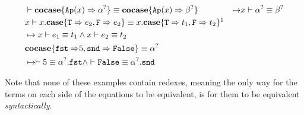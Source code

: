 \documentclass[twoside,12pt,a4paper]{article}
\begin{document}

\begin{example}
    \begin{align*}
    &\vdash \excopatmatch{\Ap{x}\Rightarrow \alphaunifvar} \equiv \excopatmatch{\Ap{x}\Rightarrow\betaunifvar} 
    &\mapsto&x\vdash \alphaunifvar \equiv \betaunifvar
    \\
    &x\vdash x.\expatmatch{\texttt{T} \Rightarrow e_2, \texttt{F} \Rightarrow e_2} \equiv x.\expatmatch{\texttt{T} \Rightarrow t_1, \texttt{F} \Rightarrow t_2}\footnotemark{}
    \\ &\mapsto x\vdash  e_1 \equiv t_1\wedge x\vdash e_2\equiv t_2
    \\
    &\excopatmatch{\mathtt{fst \Rightarrow} 5, \mathtt{snd\Rightarrow False}}\equiv \alphaunifvar
    \\ &\mapsto \vdash 5\equiv \alphaunifvar.\mathtt{fst}\wedge \vdash \mathtt{False\equiv\alphaunifvar.snd}
    \end{align*}
\end{example}



Note that none of these examples contain redexes, meaning the only way for the terms on each side of the equations to be equivalent,
is for them to be equivalent \textit{syntactically}. %
\end{document}
